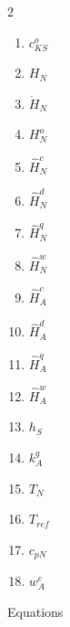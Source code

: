 \documentclass[10pt,a4paper]{report}
\begin{document}
\begin{multicols}{2}
\begin{enumerate}
			\item $c^{o}_{KS}$
			\item $H_N$
			\item $\dot{H}_N$
			\item $H^o_N$
			\item $\hat{H}^c_N$
			\item $\hat{H}^d_N$
			\item $\hat{H}^q_N$
			\item $\hat{H}^w_N$		
			\item $\hat{H}^c_A$
			\item $\hat{H}^d_A$
			\item $\hat{H}^q_A$
			\item $\hat{H}^w_A$
			\item $h_S$
			\item $k^q_A$
			\item $T_N$
			\item $T_{ref}$
			\item $c_{pN}$ 	
			\item $w^e_A$
		\end{enumerate}
	\end{multicols}	
	\newpage
	\Large{Equations}
\end{document}
